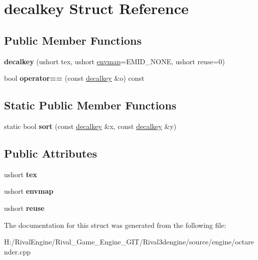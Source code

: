 \hypertarget{structdecalkey}{}\section{decalkey Struct Reference}
\label{structdecalkey}
\subsection*{Public Member Functions}
\begin{DoxyCompactItemize}
\item 
\mbox{\label{structdecalkey_a7353aef9e5f7457567ea34b9473799af}} 
{\bfseries decalkey} (ushort tex, ushort \hyperlink{structenvmap}{envmap}=E\+M\+I\+D\+\_\+\+N\+O\+NE, ushort reuse=0)
\item 
\mbox{\label{structdecalkey_a202dc581b104c5239d2e9ed8c89f4035}} 
bool {\bfseries operator==} (const \hyperlink{structdecalkey}{decalkey} \&o) const
\end{DoxyCompactItemize}
\subsection*{Static Public Member Functions}
\begin{DoxyCompactItemize}
\item 
\mbox{\label{structdecalkey_a43d94ec2066d77ccf8336befce9a389c}} 
static bool {\bfseries sort} (const \hyperlink{structdecalkey}{decalkey} \&x, const \hyperlink{structdecalkey}{decalkey} \&y)
\end{DoxyCompactItemize}
\subsection*{Public Attributes}
\begin{DoxyCompactItemize}
\item 
\mbox{\label{structdecalkey_ae8fc3afbb436de2ff981bbd2c96a1fac}} 
ushort {\bfseries tex}
\item 
\mbox{\label{structdecalkey_a70fc4be3c3707a7f0adddbc6a3ec3010}} 
ushort {\bfseries envmap}
\item 
\mbox{\label{structdecalkey_afb306180c6e47a96ac4613370c7b8dbc}} 
ushort {\bfseries reuse}
\end{DoxyCompactItemize}


The documentation for this struct was generated from the following file\+:\begin{DoxyCompactItemize}
\item 
H\+:/\+Rival\+Engine/\+Rival\+\_\+\+Game\+\_\+\+Engine\+\_\+\+G\+I\+T/\+Rival3dengine/source/engine/octarender.\+cpp\end{DoxyCompactItemize}
